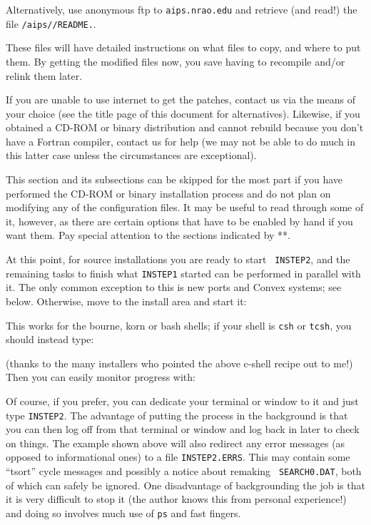 Alternatively, use anonymous ftp to {\tt aips.nrao.edu} and retrieve
(and read!) the file {\tt /aips/\THISVER/README.\THISVER}.

\noindent These files will have detailed instructions on what files to
copy, and where to put them.  By getting the modified files now, you
save having to recompile and/or relink them later.

If you are unable to use internet to get the patches, contact us via the
means of your choice (see the title page of this document for
alternatives).  Likewise, if you obtained a CD-ROM or binary
distribution and cannot rebuild because you don't have a Fortran
compiler, contact us for help (we may not be able to do much in this
latter case unless the circumstances are exceptional).

\medskip{}

This section and its subsections can be skipped for the most part if you
have performed the CD-ROM or binary installation process and do not plan
on modifying any of the configuration files.  It may be useful to read
through some of it, however, as there are certain options that have to
be enabled by hand if you want them.  Pay special attention to the
sections indicated by **.

\medskip{}

At this point, for source installations you are ready to start {\tt
INSTEP2}, and the remaining tasks to finish what {\tt INSTEP1} started
can be performed in parallel with it.  The only common exception to this
is new ports and Convex systems; see below.  Otherwise, move to the
install area and start it:\medskip

\medskip

\noindent This works for the bourne, korn or bash shells; if your shell
is {\tt csh} or {\tt tcsh}, you should instead type:\medskip

\medskip

\noindent (thanks to the many installers who pointed the above c-shell
recipe out to me!)  Then you can easily monitor progress with:\medskip

\medskip

\noindent Of course, if you prefer, you can dedicate your terminal or
window to it and just type {\tt INSTEP2}.  The advantage of putting the
process in the background is that you can then log off from that
terminal or window and log back in later to check on things.  The
example shown above will also redirect any error messages (as opposed to
informational ones) to a file {\tt INSTEP2.ERRS}.  This may contain some
``tsort'' cycle messages and possibly a notice about remaking {\tt
SEARCH0.DAT}, both of which can safely be ignored.  One disadvantage of
backgrounding the job is that it is very difficult to stop it (the
author knows this from personal experience!) and doing so involves much
use of {\tt ps} and fast fingers.

